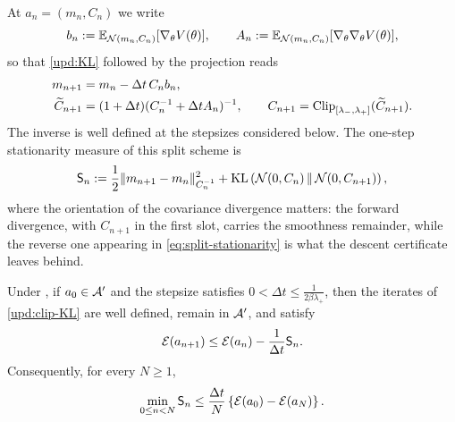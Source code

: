 At $a_n = (m_n, C_n)$ we write
\begin{equation*}
    b_n := \mathbb{E}_{\mathcal{N} (m_n, C_n)} [\nabla_\theta V (\theta)], \qquad A_n := \mathbb{E}_{\mathcal{N} (m_n, C_n)} [\nabla_\theta \nabla_\theta V (\theta)],
\end{equation*}
so that \eqref{upd:KL} followed by the projection reads
\begin{equation}\label{upd:clip-KL}
    \begin{aligned}
        m_{n+1} &= m_n - \Delta t\, C_n b_n, \\
        \widetilde{C}_{n+1} &= (1 + \Delta t) (C_n^{-1} + \Delta t A_n)^{-1}, \qquad C_{n+1} = \operatorname{Clip}_{[\lambda_-, \lambda_+]} (\widetilde{C}_{n+1}).
    \end{aligned}
\end{equation}
The inverse is well defined at the stepsizes considered below. The one-step stationarity measure of this split scheme is
\begin{equation}\label{eq:split-stationarity}
    \mathsf{S}_n := \frac{1}{2} \| m_{n+1} - m_n \|_{C_n^{-1}}^2 + \mathrm{KL} \left( \mathcal{N} (0, C_n) \, \middle\| \, \mathcal{N} (0, C_{n+1}) \right),
\end{equation}
where the orientation of the covariance divergence matters: the forward divergence, with $C_{n+1}$ in the first slot, carries the smoothness remainder, while the reverse one appearing in \eqref{eq:split-stationarity} is what the descent certificate leaves behind.

\begin{theorem}\label{thm:clip-KL}
    Under , if $a_0 \in \mathcal{A}'$ and the stepsize satisfies $0 < \Delta t \leq \frac{1}{2 \beta \lambda_+}$, then the iterates of \eqref{upd:clip-KL} are well defined, remain in $\mathcal{A}'$, and satisfy
    \begin{equation}\label{eq:clip-descent}
        \mathcal{E} (a_{n+1}) \leq \mathcal{E} (a_n) - \frac{1}{\Delta t} \mathsf{S}_n.
    \end{equation}
    Consequently, for every $N \geq 1$,
    \begin{equation}\label{eq:clip-runmin}
        \min_{0 \leq n < N} \mathsf{S}_n \leq \frac{\Delta t}{N} \left\{ \mathcal{E} (a_0) - \mathcal{E} (a_N) \right\}.
    \end{equation}
\end{theorem}

